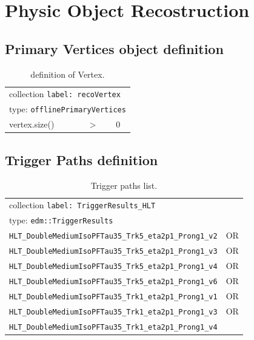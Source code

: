 \section{Physic Object Recostruction}

\subsection{Primary Vertices object definition}

\begin{table}[htb]
	\caption{definition of Vertex.}
	\label{table:vertexobjdefinition}
	\ttfamily\scriptsize\selectfont
	\begin{center}
		\begin{tabular}{|l|ll|}
			\hline
			\multicolumn{3}{|l|}{collection \texttt{label: recoVertex}}\\
			\multicolumn{3}{|l|}{type: \texttt{offlinePrimaryVertices}}\\
			\hline
			vertex.size() & $>$ & 0 \\
			\hline
		\end{tabular}
	\end{center}
\end{table}

\subsection{Trigger Paths definition}

\begin{table}[htb]
	
	\caption{Trigger paths list.}
	\label{table:triggerdefinition}
	\ttfamily\scriptsize\selectfont
	\begin{center}
		\begin{tabular}{|l|l|}
			\hline
			\multicolumn{2}{|l|}{collection \texttt{label: TriggerResults\_HLT}}\\
			\multicolumn{2}{|l|}{type: \texttt{edm::TriggerResults}}\\
			\hline
			\texttt{HLT\_DoubleMediumIsoPFTau35\_Trk5\_eta2p1\_Prong1\_v2} & OR \\
			\texttt{HLT\_DoubleMediumIsoPFTau35\_Trk5\_eta2p1\_Prong1\_v3} & OR \\
			\texttt{HLT\_DoubleMediumIsoPFTau35\_Trk5\_eta2p1\_Prong1\_v4} & OR \\
			\texttt{HLT\_DoubleMediumIsoPFTau35\_Trk5\_eta2p1\_Prong1\_v6} & OR \\
			\texttt{HLT\_DoubleMediumIsoPFTau35\_Trk1\_eta2p1\_Prong1\_v1} & OR \\
			\texttt{HLT\_DoubleMediumIsoPFTau35\_Trk1\_eta2p1\_Prong1\_v3} & OR \\
			\texttt{HLT\_DoubleMediumIsoPFTau35\_Trk1\_eta2p1\_Prong1\_v4} & \\
			\hline
		\end{tabular}
	\end{center}
\end{table}

